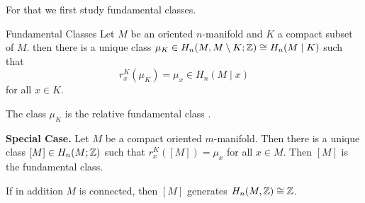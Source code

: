 \documentclass[language=english]{TemplateLecture}
\begin{document}
For that we first study fundamental classes.
\begin{thm}{Fundamental Classes}{}
    Let \(M\) be an oriented \(n\)-manifold and \(K\) a compact subset of \(M\). then there is a unique class \(\mu_K\in H_n(M, M \setminus K; \mathbb{Z}) \cong H_n(M \mid K)\) such that
    \[r_x^K(\mu_K) = \mu_x \in H_n(M \mid x)\]
    for all \(x \in K\).

    The class \(\mu_K\) is the relative fundamental class .
\end{thm}

\textbf{Special Case.} Let \(M\) be a compact oriented \(m\)-manifold. Then there is a unique class \([M] \in H_n(M; \mathbb{Z})\) such that \(r_x^K([M]) = \mu_x\) for all \(x \in M\). Then \([M]\) is the fundamental class.

If in addition \(M\) is connected, then \([M]\) generates \(H_n(M, \mathbb{Z}) \cong \mathbb{Z}\).
\end{document}
